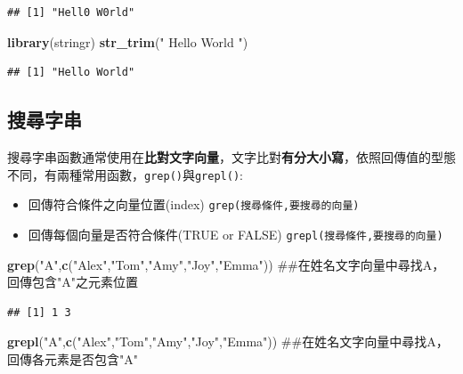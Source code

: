 \documentclass[]{book}
\newenvironment{Shaded}{\begin{snugshade}}{\end{snugshade}}
\newcommand{\KeywordTok}[1]{\textcolor[rgb]{0.13,0.29,0.53}{\textbf{{#1}}}}
\newcommand{\StringTok}[1]{\textcolor[rgb]{0.31,0.60,0.02}{{#1}}}
\newcommand{\NormalTok}[1]{{#1}}
\providecommand{\tightlist}{%
  \setlength{\itemsep}{0pt}\setlength{\parskip}{0pt}}
\theoremstyle{definition}
\theoremstyle{definition}
\theoremstyle{remark}
\begin{document}
\begin{verbatim}
## [1] "Hell0 W0rld"
\end{verbatim}

\begin{Shaded}
\begin{Highlighting}[]
\KeywordTok{library}\NormalTok{(stringr)}
\KeywordTok{str_trim}\NormalTok{(}\StringTok{" Hello World "}\NormalTok{)}
\end{Highlighting}
\end{Shaded}

\begin{verbatim}
## [1] "Hello World"
\end{verbatim}

\subsection{搜尋字串}

搜尋字串函數通常使用在\textbf{比對文字向量}，文字比對\textbf{有分大小寫}，依照回傳值的型態不同，有兩種常用函數，\texttt{grep()}與\texttt{grepl()}:

\begin{itemize}
\tightlist
\item
  回傳符合條件之向量位置(index) \texttt{grep(搜尋條件,要搜尋的向量)}
\item
  回傳每個向量是否符合條件(TRUE or FALSE)
  \texttt{grepl(搜尋條件,要搜尋的向量)}
\end{itemize}

\begin{Shaded}
\begin{Highlighting}[]
\KeywordTok{grep}\NormalTok{(}\StringTok{"A"}\NormalTok{,}\KeywordTok{c}\NormalTok{(}\StringTok{"Alex"}\NormalTok{,}\StringTok{"Tom"}\NormalTok{,}\StringTok{"Amy"}\NormalTok{,}\StringTok{"Joy"}\NormalTok{,}\StringTok{"Emma"}\NormalTok{)) ##在姓名文字向量中尋找A，回傳包含"A"之元素位置}
\end{Highlighting}
\end{Shaded}

\begin{verbatim}
## [1] 1 3
\end{verbatim}

\begin{Shaded}
\begin{Highlighting}[]
\KeywordTok{grepl}\NormalTok{(}\StringTok{"A"}\NormalTok{,}\KeywordTok{c}\NormalTok{(}\StringTok{"Alex"}\NormalTok{,}\StringTok{"Tom"}\NormalTok{,}\StringTok{"Amy"}\NormalTok{,}\StringTok{"Joy"}\NormalTok{,}\StringTok{"Emma"}\NormalTok{)) ##在姓名文字向量中尋找A，回傳各元素是否包含"A"}
\end{Highlighting}
\end{Shaded}
\end{document}
